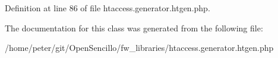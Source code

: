 Definition at line 86 of file htaccess.\-generator.\-htgen.\-php.



The documentation for this class was generated from the following file\-:\begin{DoxyCompactItemize}
\item 
/home/peter/git/\-Open\-Sencillo/fw\-\_\-libraries/htaccess.\-generator.\-htgen.\-php\end{DoxyCompactItemize}
